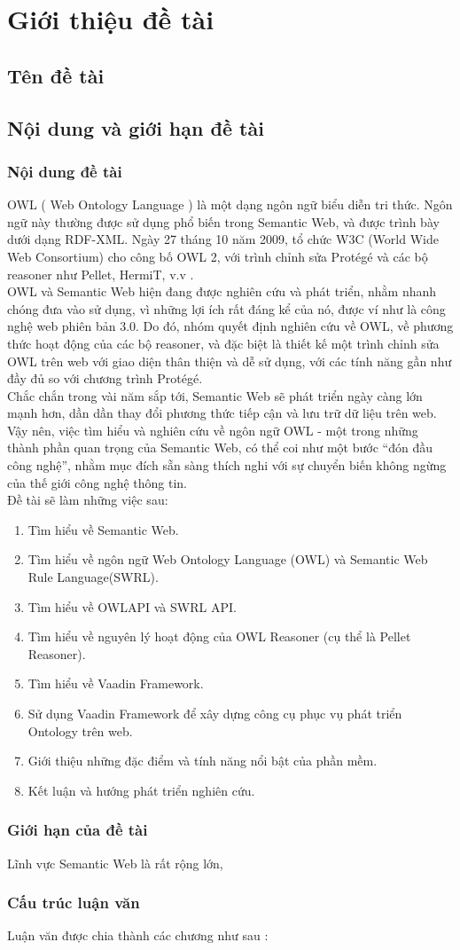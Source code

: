 \chapter {Giới thiệu đề tài}
\section{Tên đề tài}

\section{Nội dung và giới hạn đề tài}
\subsection{Nội dung đề tài}
OWL ( Web Ontology Language ) là một dạng ngôn ngữ biểu diễn tri thức. Ngôn ngữ này thường được sử dụng phổ biến trong Semantic Web, và được trình bày dưới dạng RDF-XML. Ngày 27 tháng 10 năm 2009, tổ chức W3C (World Wide Web Consortium) cho công bố OWL 2, với trình chỉnh sửa Protégé và các bộ reasoner như Pellet, HermiT, v.v .
\\
OWL và Semantic Web hiện đang được nghiên cứu và phát triển, nhằm nhanh chóng đưa vào sử dụng, vì những lợi ích rất đáng kể của nó, được ví như là công nghệ web phiên bản 3.0. Do đó, nhóm quyết định nghiên cứu về OWL, về phương thức hoạt động của các bộ reasoner, và đặc biệt là thiết kế một trình chỉnh sửa OWL trên web với giao diện thân thiện và dễ sử dụng, với các tính năng gần như đầy đủ so với chương trình Protégé. 
\\
Chắc chắn trong vài năm sắp tới, Semantic Web sẽ phát triển ngày càng lớn mạnh hơn, dần dần thay đổi phương thức tiếp cận và lưu trữ dữ liệu trên web. Vậy nên, việc tìm hiểu và nghiên cứu về ngôn ngữ OWL - một trong những thành phần quan trọng của Semantic Web, có thể coi như một bước “đón đầu công nghệ”, nhằm mục đích sẵn sàng thích nghi với sự chuyển biến không ngừng của thế giới công nghệ thông tin.
\\
Đề tài sẽ làm những việc sau:
\begin{enumerate}
\item Tìm hiểu về Semantic Web.
\item Tìm hiểu về ngôn ngữ Web Ontology Language (OWL) và Semantic Web Rule Language(SWRL).
\item Tìm hiểu về OWLAPI và SWRL API.
\item Tìm hiểu về nguyên lý hoạt động của OWL Reasoner (cụ thể là Pellet Reasoner).
\item Tìm hiểu về Vaadin Framework.
\item Sử dụng Vaadin Framework để xây dựng công cụ phục vụ phát triển Ontology trên web.
\item Giới thiệu những đặc điểm và tính năng nổi bật của phần mềm.
\item Kết luận và hướng phát triển nghiên cứu.
\end{enumerate}
\subsection{Giới hạn của đề tài}
Lĩnh vực Semantic Web là rất rộng lớn, 

\subsection{Cấu trúc luận văn}
Luận văn được chia thành các chương như sau : 
